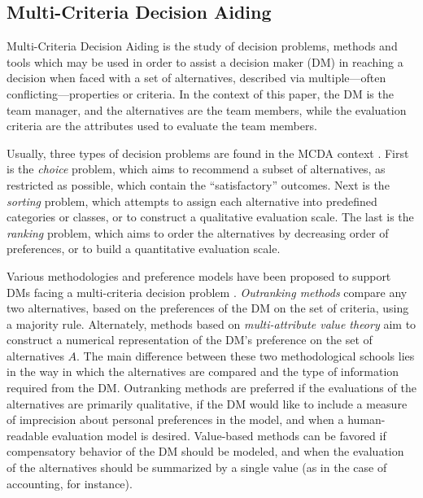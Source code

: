 \subsection{Multi-Criteria Decision Aiding}\label{sec:MCDA}

Multi-Criteria Decision Aiding is the study of decision problems, methods and tools which may be used in order to assist a decision maker (DM) in reaching a decision when faced with a set of alternatives, described via multiple---often conflicting---properties or criteria. In the context of this paper, the DM is the team manager, and the alternatives are the team members, while the evaluation criteria are the attributes used to evaluate the team members.

Usually, three types of decision problems are found in the MCDA context \citep{roy96}. First is the {\em choice} problem, which aims to recommend a subset of alternatives, as restricted as possible, which contain the ``satisfactory'' outcomes. Next is the {\em sorting} problem, which attempts to assign each alternative into predefined categories or classes, or to construct a qualitative evaluation scale. The last is the {\em ranking} problem, which aims to order the alternatives by decreasing order of preferences, or to build a quantitative evaluation scale.



Various methodologies and preference models have been proposed to support DMs facing a multi-criteria decision problem \citep{bouyssouMarchantPirlotTsoukiasVincke06,keeneyRaiffa76,roy96}. {\em Outranking methods} compare any two alternatives, based on the preferences of the DM on the set of criteria, using a majority rule. Alternately, methods based on {\em multi-attribute value theory} aim to construct a numerical representation of the DM's preference on the set of alternatives $A$. The main difference between these two methodological schools lies in the way in which the alternatives are compared and the type of information required from the DM. Outranking methods are preferred if the evaluations of the alternatives are primarily qualitative, if the DM would like to include a measure of imprecision about personal preferences in the model, and when a human-readable evaluation model is desired. Value-based methods can be favored if compensatory behavior of the DM should be modeled, and when the evaluation of the alternatives should be summarized by a single value (as in the case of accounting, for instance).

